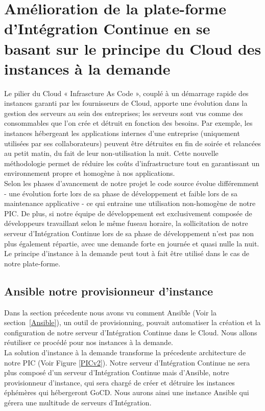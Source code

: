       \section{Amélioration de la plate-forme d'Intégration Continue en se basant sur le principe du Cloud des instances à la demande}
      Le pilier du Cloud « Infrascture As Code », couplé à un démarrage rapide des instances garanti par les fournisseurs de Cloud, apporte une évolution dans la gestion des serveurs au sein des entreprises; les serveurs sont vus comme des consommables que l'on crée et détruit en fonction des besoins. Par exemple, les instances hébergeant les applications internes d'une entreprise (uniquement utilisées par ses collaborateurs) peuvent être détruites en fin de soirée et relancées au petit matin, du fait de leur non-utilisation la nuit. Cette nouvelle méthodologie permet de réduire les coûts d'infrastructure tout en garantissant un environnement propre et homogène à nos applications.\\

      Selon les phases d'avancement de notre projet le code source évolue différemment - une évolution forte lors de sa phase de développement et faible lors de sa maintenance applicative - ce qui entraine une utilisation non-homogène de notre PIC. De plus, si notre équipe de développement est exclusivement composée de développeurs travaillant selon le même fuseau horaire, la sollicitation de notre serveur d'Intégration Continue lors de sa phase de développement n'est pas non plus également répartie, avec une demande forte en journée et quasi nulle la nuit. Le principe d'instance à la demande peut tout à fait être utilisé dans le cas de notre plate-forme.\\

        \subsection{Ansible notre provisionneur d'instance}
        Dans la section précedente nous avons vu comment Ansible (Voir la section~\ref{Ansible}), un outil de provisionning, pouvait automatiser la création et la configuration de notre serveur d'Intégration Continue dans le Cloud. Nous allons réutiliser ce procédé pour nos instances à la demande.\\

        La solution d'instance à la demande transforme la précedente architecture de notre PIC (Voir Figure \ref{PICv2}). Notre serveur d'Intégration Continue ne sera plus composé d'un serveur d'Intégration Continue mais d'Ansible, notre provisionneur d'instance, qui sera chargé de créer et détruire les instances éphémères qui hébergeront GoCD. Nous aurons ainsi une instance Ansible qui gérera une multitude de serveurs d'Intégration.

